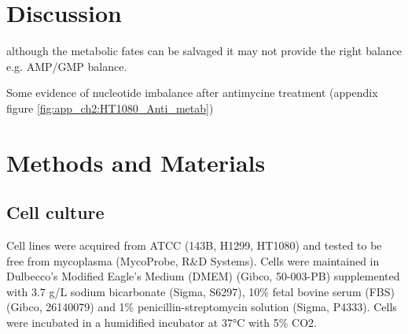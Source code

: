 \section{Discussion}


although the metabolic fates can be salvaged it may not provide the right balance e.g. AMP/GMP balance.

Some evidence of nucleotide imbalance after antimycine treatment (appendix figure \ref{fig:app_ch2:HT1080_Anti_metab})











\section{Methods and Materials}
\subsection{Cell culture}
Cell lines were acquired from ATCC (143B, H1299, HT1080) and tested to be free from mycoplasma (MycoProbe, R\&D Systems).
Cells were maintained in Dulbecco’s Modified Eagle’s Medium (DMEM) (Gibco, 50-003-PB) supplemented with 3.7 g/L sodium bicarbonate (Sigma, S6297), 10\% fetal bovine serum (FBS) (Gibco, 26140079) and 1\% penicillin-streptomycin solution (Sigma, P4333).
Cells were incubated in a humidified incubator at 37°C with 5\% CO2.


